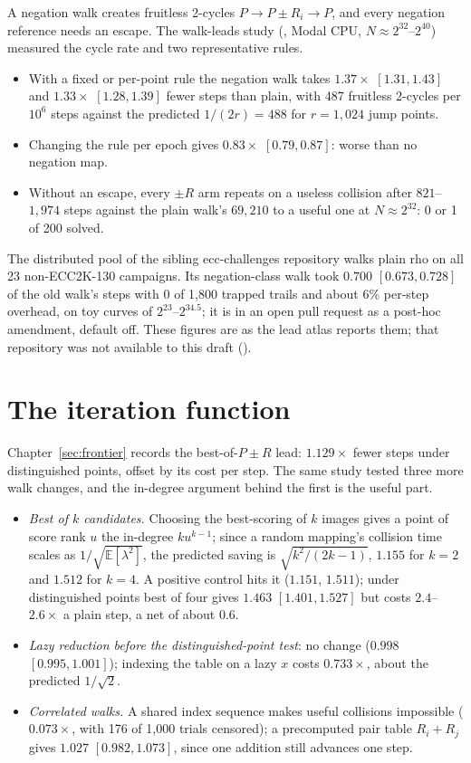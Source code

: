 A negation walk creates fruitless 2-cycles $P\to P\pm R_i\to P$, and every
negation reference needs an escape. The walk-leads study
(, Modal CPU, $N\approx2^{32}$--$2^{40}$)
measured the cycle rate and two representative rules.
\begin{itemize}
\item With a fixed or per-point rule the negation walk takes $1.37\times$
  $[1.31,1.43]$ and $1.33\times$ $[1.28,1.39]$ fewer steps than plain, with
  487 fruitless 2-cycles per $10^6$ steps against the predicted $1/(2r)=488$
  for $r=1{,}024$ jump points.
\item Changing the rule per epoch gives $0.83\times$ $[0.79,0.87]$: worse
  than no negation map.
\item Without an escape, every $\pm R$ arm repeats on a useless collision
  after $821$--$1{,}974$ steps against the plain walk's $69{,}210$ to a
  useful one at $N\approx2^{32}$: 0 or 1 of 200 solved.
\end{itemize}
The distributed pool of the sibling ecc-challenges repository walks plain
rho on all 23 non-ECC2K-130 campaigns. Its negation-class walk took $0.700$
$[0.673,0.728]$ of the old walk's steps with 0 of 1{,}800 trapped trails and
about $6\%$ per-step overhead, on toy curves of $2^{23}$--$2^{34.5}$; it is
in an open pull request as a post-hoc amendment, default off. These figures
are as the lead atlas reports them; that repository was not available to
this draft
().

\section{The iteration function}\label{sec:rv-mixing}

Chapter~\ref{sec:frontier} records the best-of-$P\pm R$ lead: $1.129\times$
fewer steps under distinguished points, offset by its cost per step. The
same study tested three more walk changes, and the in-degree argument
behind the first is the useful part.
\begin{itemize}
\item \emph{Best of $k$ candidates.} Choosing the best-scoring of $k$
  images gives a point of score rank $u$ the in-degree $ku^{k-1}$; since a
  random mapping's collision time scales as $1/\sqrt{\mathbb{E}[\lambda^2]}$,
  the predicted saving is $\sqrt{k^2/(2k-1)}$, $1.155$ for $k=2$ and $1.512$
  for $k=4$. A positive control hits it ($1.151$, $1.511$); under
  distinguished points best of four gives $1.463$ $[1.401,1.527]$ but costs
  $2.4$--$2.6\times$ a plain step, a net of about $0.6$.
\item \emph{Lazy reduction before the distinguished-point test}: no change
  ($0.998$ $[0.995,1.001]$); indexing the table on a lazy $x$ costs
  $0.733\times$, about the predicted $1/\sqrt2$.
\item \emph{Correlated walks.} A shared index sequence makes useful
  collisions impossible ($0.073\times$, with 176 of 1{,}000 trials
  censored); a precomputed pair table $R_i+R_j$ gives $1.027$
  $[0.982,1.073]$, since one addition still advances one step.
\end{itemize}

